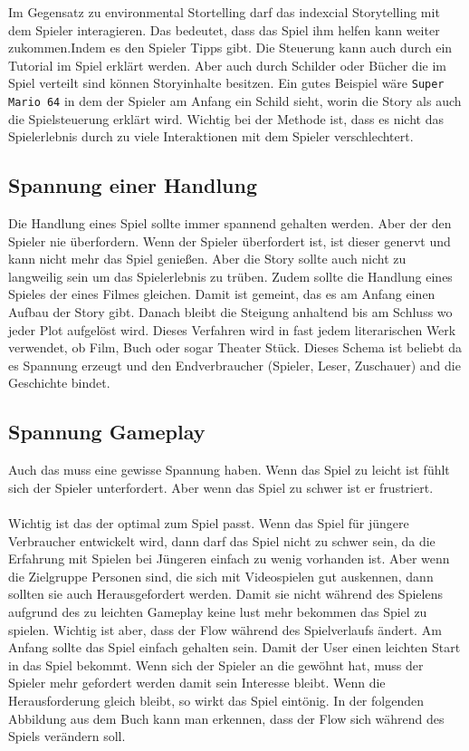 Im Gegensatz zu environmental Stortelling darf das indexcial Storytelling mit dem Spieler interagieren. Das bedeutet, dass das Spiel ihm helfen kann weiter zukommen.Indem es den Spieler Tipps gibt. Die Steuerung kann auch durch ein Tutorial im Spiel erklärt werden. Aber auch durch Schilder oder Bücher die im Spiel verteilt sind können Storyinhalte besitzen. Ein gutes Beispiel wäre \verb+Super Mario 64+ in dem der Spieler am Anfang ein Schild sieht, worin die Story als auch die Spielsteuerung erklärt wird. Wichtig bei der Methode ist, dass es nicht das Spielerlebnis durch zu viele Interaktionen mit dem Spieler verschlechtert. 

\subsection{Spannung einer Handlung}
Die Handlung eines Spiel sollte immer spannend gehalten werden. Aber der den Spieler nie überfordern. Wenn der Spieler überfordert ist, ist dieser genervt und kann nicht mehr das Spiel genießen. Aber die Story sollte auch nicht zu langweilig sein um das Spielerlebnis zu trüben. Zudem sollte die Handlung eines Spieles der eines Filmes gleichen. Damit ist gemeint, das es am Anfang einen Aufbau der Story gibt. Danach bleibt die Steigung anhaltend bis am Schluss wo jeder Plot aufgelöst wird. Dieses Verfahren wird in fast jedem literarischen Werk verwendet, ob Film, Buch oder sogar Theater Stück. Dieses Schema ist beliebt da es Spannung erzeugt und den Endverbraucher (Spieler, Leser, Zuschauer) and die Geschichte bindet.

\subsection{Spannung Gameplay}
Auch das  muss eine gewisse Spannung haben. Wenn das Spiel zu leicht ist fühlt sich der Spieler unterfordert. Aber wenn das Spiel zu schwer ist er frustriert.\\\\
Wichtig ist das der  optimal zum Spiel passt. Wenn das Spiel für jüngere Verbraucher entwickelt wird, dann darf das Spiel nicht zu schwer sein, da die Erfahrung mit Spielen bei Jüngeren einfach zu wenig vorhanden ist. Aber wenn die Zielgruppe Personen sind, die sich mit Videospielen gut auskennen, dann sollten sie auch Herausgefordert werden. Damit sie nicht während des Spielens aufgrund des zu leichten Gameplay keine lust mehr bekommen das Spiel zu spielen. Wichtig ist aber, dass der Flow während des Spielverlaufs ändert. Am Anfang sollte das Spiel einfach gehalten sein. Damit der User einen leichten Start in das Spiel bekommt. Wenn sich der Spieler an die  gewöhnt hat, muss der Spieler mehr gefordert werden damit sein Interesse bleibt. Wenn die Herausforderung gleich bleibt, so wirkt das Spiel eintönig. In der folgenden Abbildung aus dem Buch  kann man erkennen, dass der Flow sich während des Spiels verändern soll.


